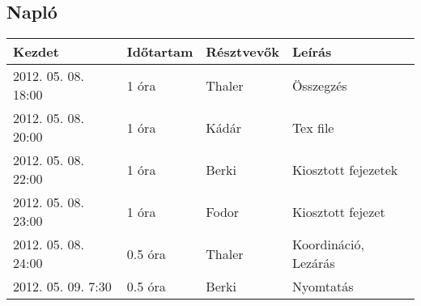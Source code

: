 	\subsection{Napló}
    \begin{center} 
        \begin{tabular}{| l | p{1.9cm} | p{2.6cm} | p{6.1cm} |}
            \hline
                Kezdet & Időtartam & Résztvevők & Leírás \\
            \hline \hline 
2012. 05. 08. 18:00 & 1 óra & Thaler & Összegzés\\ \hline
2012. 05. 08. 20:00 & 1 óra & Kádár & Tex file\\ \hline
2012. 05. 08. 22:00 & 1 óra & Berki & Kiosztott fejezetek\\ \hline
2012. 05. 08. 23:00 & 1 óra & Fodor & Kiosztott fejezet\\ \hline
2012. 05. 08. 24:00 & 0.5 óra & Thaler & Koordináció, Lezárás\\ \hline
2012. 05. 09. 7:30 & 0.5 óra & Berki & Nyomtatás\\ \hline

            \hline
        \end{tabular}
    \end{center}

